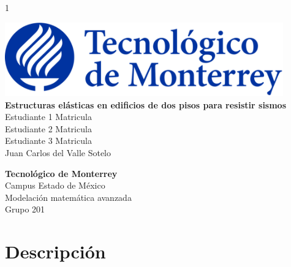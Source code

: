 \documentclass[12pt]{report}
\begin{document}
\begin{titlepage}
    \begin{flushright}
        1
    \end{flushright}
    
    
    \begin{center}
        \includegraphics[width=12cm]{assets/itesm_logo.png}\\[2cm]
        
        {\Huge \textbf{Estructuras elásticas en edificios de dos pisos para resistir sismos}}\\[2cm]
        
        \large
        Estudiante 1 Matricula\\
        Estudiante 2 Matricula\\
        Estudiante 3 Matricula\\[1cm]
        
        Juan Carlos del Valle Sotelo\\[1cm]

        \date{Abril 2025}
        
        \textbf{Tecnológico de Monterrey}\\
        Campus Estado de México\\
        Modelación matemática avanzada  \\
        Grupo 201
    \end{center}
\end{titlepage}

\section{Descripción}
\end{document}
